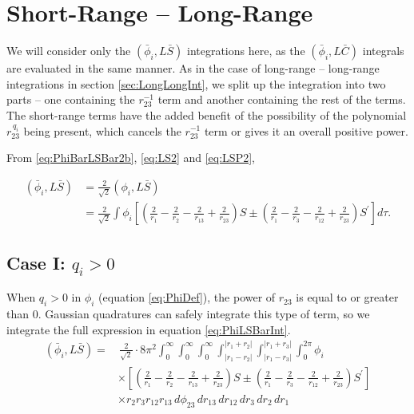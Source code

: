 \documentclass[Dissertation.tex]{subfiles}
\begin{document}
\section{Short-Range -- Long-Range}
\label{sec:ShortLongInt}
We will consider only the $(\bar{\phi}_i,L\bar{S})$ integrations here, as the $(\bar{\phi}_i,L\bar{C})$ integrals are evaluated in the same manner.  As in the case of long-range -- long-range integrations in section \ref{sec:LongLongInt}, we split up the integration into two parts -- one containing the $r_{23}^{-1}$ term and another containing the rest of the terms.  The short-range terms have the added benefit of the possibility of the polynomial $r_{23}^{\,q_i}$ being present, which cancels the $r_{23}^{-1}$ term or gives it an overall positive power.


From \ref{eq:PhiBarLSBar2b}, \ref{eq:LS2} and \ref{eq:LSP2}, 

\begin{align}
\label{eq:PhiLSBarInt}
\nonumber (\bar{\phi}_i, L\bar{S}) &= \frac{2}{\sqrt{2}} \left(\phi_i,L\bar{S}\right) \\
 &= \frac{2}{\sqrt{2}} \int \phi_i \left[ \left( \frac{2}{r_1} - \frac{2}{r_2} - \frac{2}{r_{13}} + \frac{2}{r_{23}} \right)S \pm \left( \frac{2}{r_1} - \frac{2}{r_3} - \frac{2}{r_{12}} + \frac{2}{r_{23}} \right) S^\prime \right]  d\tau.
\end{align}

\subsection{Case I: \texorpdfstring{$q_i > 0$}{qi > 0}}
\label{sec:Swaveqigt0}
When $q_i > 0$ in $\phi_i$ (equation \ref{eq:PhiDef}), the power of $r_{23}$ is equal to or greater than 0.  Gaussian quadratures can safely integrate this type of term, so we integrate the full expression in equation \ref{eq:PhiLSBarInt}.
\begin{align}
\label{eq:PhiLSBarIntFull}
\nonumber (\bar{\phi}_i, L\bar{S}) =& \, \frac{2}{\sqrt{2}} \cdot 8\pi^2  \int_0^\infty \int_0^\infty \int_0^\infty \int_{|r_1 - r_2|}^{|r_1 + r_2|} \int_{|r_1 - r_3|}^{|r_1 + r_3|} \int_0^{2\pi} \phi_i \\
&\times \left[ \left( \frac{2}{r_1} - \frac{2}{r_2} - \frac{2}{r_{13}} + \frac{2}{r_{23}} \right)S \pm \left( \frac{2}{r_1} - \frac{2}{r_3} - \frac{2}{r_{12}} + \frac{2}{r_{23}} \right) S^\prime \right] \\
&\times r_2 r_3 r_{12} r_{13}\, d\phi_{23}\, dr_{13}\, dr_{12}\, dr_3\, dr_2\, dr_1
\end{align}
\end{document}
